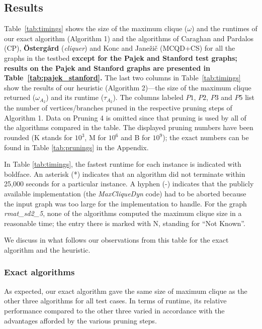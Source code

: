 \subsection{Results}
\label{sec:exp-results}




Table~\ref{tab:timings} shows the size of the maximum clique ($\omega$) and the runtimes  of our exact algorithm (Algorithm 1) and the algorithms of Caraghan and Pardalos (CP), 
{\bf \"{O}sterg{\aa}rd} ({\it cliquer}) 
and Konc and Jane\v{z}i\v{c}  (MCQD+CS) for all the graphs in the testbed {\bf except  for 
the Pajek and Stanford test graphs;
results on the Pajek and Stanford graphs are presented in Table~\ref{tab:pajek_stanford}. }
The last two columns in Table~\ref{tab:timings} show the results of our 
heuristic (Algorithm 2)---the size of the maximum clique 
returned ($\omega_{A_2}$)  and its runtime ($\tau_{A_2}$). 
The columns labeled $P1$, $P2$, $P3$ and $P5$ list the number of 
vertices/branches pruned in the respective pruning steps of Algorithm 1.
Data on Pruning 4 is omitted since that pruning is used by all of the algorithms compared in the table. The displayed pruning numbers have been rounded  (K stands for $10^3$, M for $10^6$ and B for $10^9$);
the exact numbers can be found in Table \ref{tab:prunings} in the Appendix.

In Table \ref{tab:timings}, the fastest runtime for each instance is indicated with boldface. 
An asterisk (*) indicates that an algorithm did not terminate within 25,000 seconds for a particular
instance. A hyphen (-) indicates that the publicly available implementation 
(the {\it MaxCliqueDyn} code) had to be aborted because the input graph was too large 
for the implementation to handle.
For the graph {\it rmat\_sd2\_5}, none of the algorithms computed the maximum clique size in 
a reasonable time; the entry there is marked with N, standing for  ``Not Known''.

We discuss in what follows our observations from this table
for the exact algorithm and the heuristic.

\subsubsection{Exact algorithms}
\label{sec:exp-exact}

As expected, our exact algorithm gave the same size of maximum clique as the other
three algorithms for all test cases. 
In terms of runtime,  its relative performance compared to the other three varied
in accordance with the advantages afforded by the various pruning steps.  

